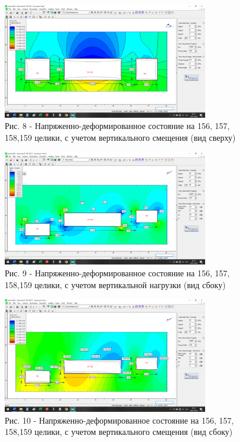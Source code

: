 \begin{figure}[H]
	\centering
	\includegraphics[width=0.8\textwidth]{media/gor/image12}
	\caption*{Рис. 8 - Напряженно-деформированное состояние на 156, 157,
	158,159 целики, с учетом вертикального смещения (вид сверху)}
\end{figure}



\begin{figure}[H]
	\centering
	\includegraphics[width=0.8\textwidth]{media/gor/image13}
	\caption*{Рис. 9 - Напряженно-деформированное состояние на 156, 157,
	158,159 целики, с учетом вертикальной нагрузки (вид сбоку)}
\end{figure}



\begin{figure}[H]
	\centering
	\includegraphics[width=0.8\textwidth]{media/gor/image14}
	\caption*{Рис. 10 - Напряженно-деформированное состояние на 156, 157,
	158,159 целики, с учетом вертикального смещения (вид сбоку)}
\end{figure}


